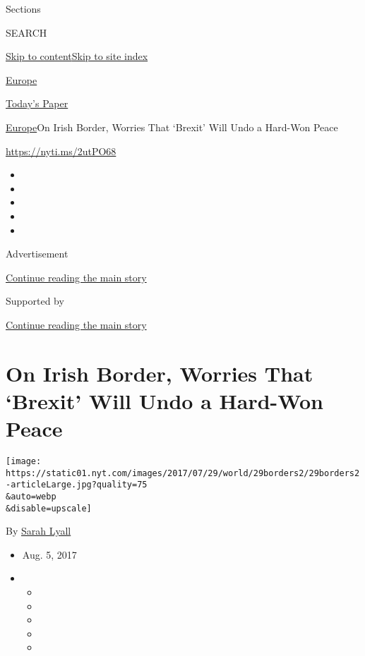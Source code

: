 Sections

SEARCH

\protect\hyperlink{site-content}{Skip to
content}\protect\hyperlink{site-index}{Skip to site index}

\href{https://www.nytimes.com/section/world/europe}{Europe}

\href{https://myaccount.nytimes.com/auth/login?response_type=cookie\&client_id=vi}{}

\href{https://www.nytimes.com/section/todayspaper}{Today's Paper}

\href{/section/world/europe}{Europe}\textbar{}On Irish Border, Worries
That `Brexit' Will Undo a Hard-Won Peace

\url{https://nyti.ms/2utPO68}

\begin{itemize}
\item
\item
\item
\item
\item
\end{itemize}

Advertisement

\protect\hyperlink{after-top}{Continue reading the main story}

Supported by

\protect\hyperlink{after-sponsor}{Continue reading the main story}

\hypertarget{on-irish-border-worries-that-brexit-will-undo-a-hard-won-peace}{%
\section{On Irish Border, Worries That `Brexit' Will Undo a Hard-Won
Peace}\label{on-irish-border-worries-that-brexit-will-undo-a-hard-won-peace}}

\texttt{[image: https://static01.nyt.com/images/2017/07/29/world/29borders2/29borders2-articleLarge.jpg?quality=75\\\&auto=webp\\\&disable=upscale]}

By \href{http://www.nytimes.com/by/sarah-lyall}{Sarah Lyall}

\begin{itemize}
\item
  Aug. 5, 2017
\item
  \begin{itemize}
  \item
  \item
  \item
  \item
  \item
  \end{itemize}
\end{itemize}

